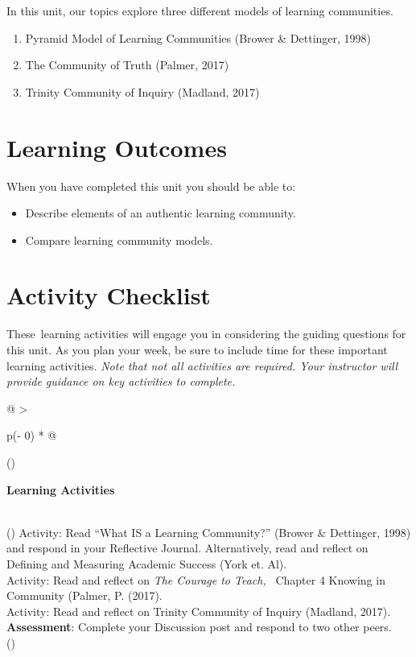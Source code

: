 \documentclass[
]{book}
\providecommand{\tightlist}{%
  \setlength{\itemsep}{0pt}\setlength{\parskip}{0pt}}
\begin{document}
In this unit, our topics explore three different models of learning communities.

\begin{enumerate}
\def\labelenumi{\arabic{enumi}.}
\tightlist
\item
  Pyramid Model of Learning Communities (Brower \& Dettinger, 1998)
\item
  The Community of Truth (Palmer, 2017)
\item
  Trinity Community of Inquiry (Madland, 2017)
\end{enumerate}

\hypertarget{learning-outcomes-3}{%
\section*{Learning Outcomes}\label{learning-outcomes-3}}

When you have completed this unit you should be able to:

\begin{itemize}
\tightlist
\item
  Describe elements of an authentic learning community.
\item
  Compare learning community models.
\end{itemize}

\hypertarget{activity-checklist-3}{%
\section*{Activity Checklist}\label{activity-checklist-3}}

These~learning activities will engage you in considering the guiding questions for this unit. As you plan your week, be sure to include time for these important learning activities. \emph{Note that not all activities are required. Your instructor will provide guidance on key activities to complete.}

\begin{longtable}[]{@{}
  >{\raggedright\arraybackslash}p{(\columnwidth - 0\tabcolsep) * }@{}}
\toprule()
\begin{minipage}[b]{\linewidth}\raggedright
\textbf{Learning Activities}
\end{minipage} \\
\midrule()
\endhead
Activity: Read ``What IS a Learning Community?'' (Brower \& Dettinger, 1998) and respond in your Reflective Journal. Alternatively, read and reflect on Defining and Measuring Academic Success (York et. Al). \\
Activity: Read and reflect on \emph{The Courage to Teach,} ~Chapter 4 Knowing in Community (Palmer, P. (2017). \\
Activity: Read and reflect on Trinity Community of Inquiry (Madland, 2017). \\
\textbf{Assessment}: Complete your Discussion post and respond to two other peers. \\
\bottomrule()
\end{longtable}
\end{document}
